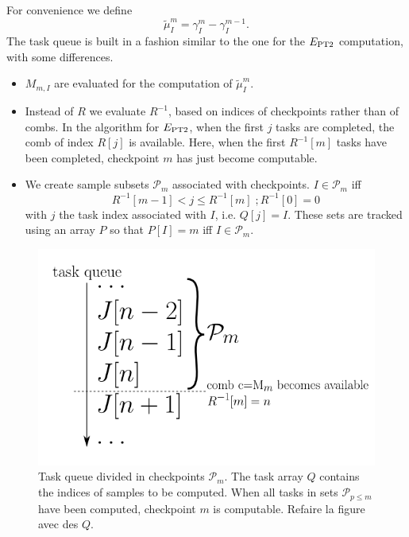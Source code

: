 \documentclass[./thesis.tex]{subfiles}
\begin{document}
For convenience we define
\begin{equation}
\tilde \mu^m_I = \gamma^m_I - \gamma^{m-1}_I.
\end{equation}
The task queue is built in a fashion similar to the one for the $E_\text{PT2}$ computation, with some differences.
\begin{itemize}
\item
$M_{m,I}$ are evaluated for the computation of $\tilde \mu^m_I$.
\item
Instead of $R$ we evaluate $R^{-1}$, based on indices of checkpoints rather than of combs. In the algorithm for $E_\text{PT2}$, when the first $j$ tasks are completed, the comb of index $R[j]$ is available. Here, when the first $R^{-1}[m]$ tasks have been completed, checkpoint $m$ has just become computable.
\item
We create sample subsets $\mathcal{P}_m$ associated with checkpoints. $I \in \mathcal{P}_m$ iff
\begin{equation}
R^{-1}[m-1] < j \leq R^{-1}[m]  \;; R^{-1}[0] = 0
\end{equation}
with $j$ the task index associated with $I$, i.e. $Q[j]=I$. These sets are tracked using an array $P$ so that $P[I]=m$ iff $I \in \mathcal{P}_m$.

\end{itemize}

\begin{figure}[h!]
	\begin{center}
		\includegraphics[width=0.45\columnwidth]{figures/matrix_dressing/taskqueue}
		\caption{Task queue divided in checkpoints $\mathcal{P}_m$. The task array $Q$ contains the indices of samples to be computed. When all tasks in sets $\mathcal{P}_{p\leq m}$ have been computed, checkpoint $m$ is computable.
\alert{Refaire la figure avec des $Q$.}
}
		\label{fig:task_queue}
	\end{center}
\end{figure}
\end{document}
